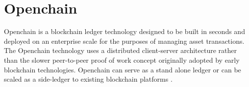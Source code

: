 \section{Openchain}

Openchain is a blockchain ledger technology designed to be built in seconds and
deployed on an enterprise scale for the purposes of managing asset
transactions. The Openchain technology uses a distributed client-server
architecture rather than the slower peer-to-peer proof of work concept
originally adopted by early blockchain technologies. Openchain can serve as a
stand alone ledger or can be scaled as a side-ledger to existing blockchain
platforms \cite{Openchain}.

